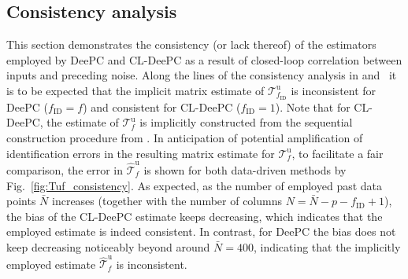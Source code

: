 \subsection{Consistency analysis}
This section demonstrates the consistency (or lack thereof) of the estimators employed by \ac{DeePC} and \ac{CL-DeePC} as a result of closed-loop correlation between inputs and preceding noise. Along the lines of the consistency analysis in  and~\cite{Dinkla2023} it is to be expected that the implicit matrix estimate of $\mathcal{T}_{f_\mathrm{ID}}^\mathrm{u}$ is inconsistent for \ac{DeePC} ($f_\mathrm{ID}=f$) and consistent for \ac{CL-DeePC} ($f_\mathrm{ID}=1$). Note that for \ac{CL-DeePC}, the estimate of $\mathcal{T}_f^\mathrm{u}$ is implicitly constructed from the sequential construction procedure from . In anticipation of potential amplification of identification errors in the resulting matrix estimate for $\mathcal{T}_f^\mathrm{u}$, to facilitate a fair comparison, the error in $\widehat{\mathcal{T}}_f^\mathrm{u}$ is shown for both data-driven methods by Fig.~\ref{fig:Tuf_consistency}. As expected, as the number of employed past data points $\bar{N}$ increases (together with the number of columns $N=\bar{N}-p-f_\mathrm{ID}+1$), the bias of the \ac{CL-DeePC} estimate keeps decreasing, which indicates that the employed estimate is indeed consistent. In contrast, for \ac{DeePC} the bias does not keep decreasing noticeably beyond around $\bar{N}=400$, indicating that the implicitly employed estimate $\widehat{\mathcal{T}}_f^\mathrm{u}$ is inconsistent.
